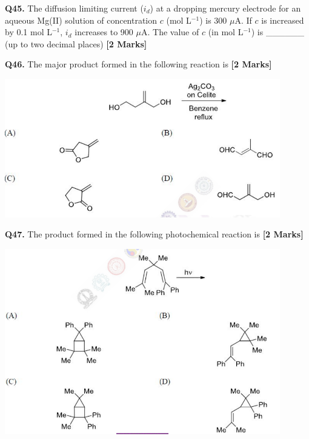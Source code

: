\documentclass[11pt]{article}
\newcommand{\questionb}[2]{
    \noindent\textbf{Q#2.} #1 \hfill \textbf{[2 Marks]}
}
\begin{document}
\questionb{The diffusion limiting current (\(i_d\)) at a dropping mercury electrode for an aqueous Mg(II) solution of concentration \( c \) (mol L\(^{-1}\)) is 300 \(\mu\)A. If \( c \) is increased by 0.1 mol L\(^{-1}\), \( i_d \) increases to 900 \(\mu\)A. The value of \( c \) (in mol L\(^{-1}\)) is \_\_\_\_\_\_ (up to two decimal places)}{45}
\vspace{0.5cm}

\questionb{The major product formed in the following reaction is}{46}
\begin{center}
\includegraphics[width=0.9\textwidth]{figures/46.png}
\end{center}

\vspace{0.5cm}

\questionb{The product formed in the following photochemical reaction is}{47}
\begin{center}
\includegraphics[width=0.9\textwidth]{figures/47.png}
\end{center}
\vspace{0.5cm}
\end{document}
